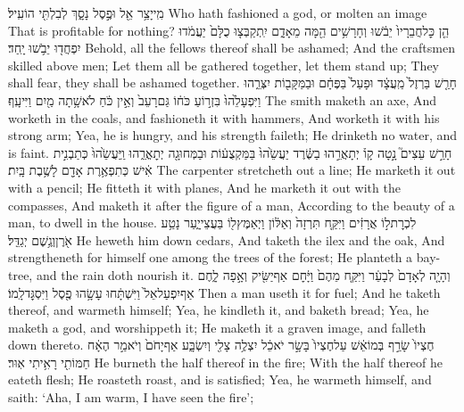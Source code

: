 {מִֽי\maqqaf יָצַ֥ר אֵ֖ל וּפֶ֣סֶל נָסָ֑ךְ לְבִלְתִּ֖י הוֹעִֽיל׃}
{Who hath fashioned a god, or molten an image That is profitable for nothing?}
{הֵ֤ן כׇּל\maqqaf חֲבֵרָיו֙ יֵבֹ֔שׁוּ וְחָרָשִׁ֥ים הֵ֖מָּה מֵאָדָ֑ם יִֽתְקַבְּצ֤וּ כֻלָּם֙ יַעֲמֹ֔דוּ יִפְחֲד֖וּ יֵבֹ֥שׁוּ יָֽחַד׃}
{Behold, all the fellows thereof shall be ashamed; And the craftsmen skilled above men; Let them all be gathered together, let them stand up; They shall fear, they shall be ashamed together.}
{חָרַ֤שׁ בַּרְזֶל֙ מַֽעֲצָ֔ד וּפָעַל֙ בַּפֶּחָ֔ם וּבַמַּקָּב֖וֹת יִצְּרֵ֑הוּ וַיִּפְעָלֵ֙הוּ֙ בִּזְר֣וֹעַ כֹּח֔וֹ גַּם\maqqaf רָעֵב֙ וְאֵ֣ין כֹּ֔חַ לֹא\maqqaf שָׁ֥תָה מַ֖יִם וַיִּיעָֽף׃}
{The smith maketh an axe, And worketh in the coals, and fashioneth it with hammers, And worketh it with his strong arm; Yea, he is hungry, and his strength faileth; He drinketh no water, and is faint.}
{חָרַ֣שׁ עֵצִים֮ נָ֣טָה קָו֒ יְתָאֲרֵ֣הוּ בַשֶּׂ֔רֶד יַעֲשֵׂ֙הוּ֙ בַּמַּקְצֻע֔וֹת וּבַמְּחוּגָ֖ה יְתׇאֳרֵ֑הוּ וַֽיַּעֲשֵׂ֙הוּ֙ כְּתַבְנִ֣ית אִ֔ישׁ כְּתִפְאֶ֥רֶת אָדָ֖ם לָשֶׁ֥בֶת בָּֽיִת׃}
{The carpenter stretcheth out a line; He marketh it out with a pencil; He fitteth it with planes, And he marketh it out with the compasses, And maketh it after the figure of a man, According to the beauty of a man, to dwell in the house.}
{לִכְרׇת\maqqaf ל֣וֹ אֲרָזִ֔ים וַיִּקַּ֤ח תִּרְזָה֙ וְאַלּ֔וֹן וַיְאַמֶּץ\maqqaf ל֖וֹ בַּעֲצֵי\maqqaf יָ֑עַר נָטַ֥ע אֹ֖רֶ\footnotesize ן\normalsize\space וְגֶ֥שֶׁם יְגַדֵּֽל׃}
{He heweth him down cedars, And taketh the ilex and the oak, And strengtheneth for himself one among the trees of the forest; He planteth a bay-tree, and the rain doth nourish it.}
{וְהָיָ֤ה לְאָדָם֙ לְבָעֵ֔ר וַיִּקַּ֤ח מֵהֶם֙ וַיָּ֔חׇם אַף\maqqaf יַשִּׂ֖יק וְאָ֣פָה לָ֑חֶם אַף\maqqaf יִפְעַל\maqqaf אֵל֙ וַיִּשְׁתָּ֔חוּ עָשָׂ֥הוּ פֶ֖סֶל וַיִּסְגׇּד\maqqaf לָֽמוֹ׃}
{Then a man useth it for fuel; And he taketh thereof, and warmeth himself; Yea, he kindleth it, and baketh bread; Yea, he maketh a god, and worshippeth it; He maketh it a graven image, and falleth down thereto.}
{חֶצְיוֹ֙ שָׂרַ֣ף בְּמוֹ\maqqaf אֵ֔שׁ עַל\maqqaf חֶצְיוֹ֙ בָּשָׂ֣ר יֹאכֵ֔ל יִצְלֶ֥ה צָלִ֖י וְיִשְׂבָּ֑ע אַף\maqqaf יָחֹם֙ וְיֹאמַ֣ר הֶאָ֔ח חַמּוֹתִ֖י רָאִ֥יתִי אֽוּר׃}
{He burneth the half thereof in the fire; With the half thereof he eateth flesh; He roasteth roast, and is satisfied; Yea, he warmeth himself, and saith: ‘Aha, I am warm, I have seen the fire’;}
